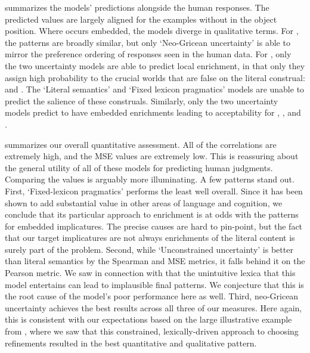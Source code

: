\documentclass[leqno,12pt]{article}
\begin{document}
 summarizes the models' predictions alongside
the human responses. The predicted values are largely aligned for the
examples without  in the object position. Where 
occurs embedded, the models diverge in qualitative terms. For
, the patterns are broadly similar, but only
`Neo-Gricean uncertainty' is able to mirror the preference ordering of
responses seen in the human data. For , only
the two uncertainty models are able to predict local enrichment, in
that only they assign high probability to the crucial worlds that are
false on the literal construal:  and . The
`Literal semantics' and `Fixed lexicon pragmatics' models are unable
to predict the salience of these construals. Similarly, only the two
uncertainty models predict  to have embedded
enrichments leading to acceptability for , , and
.


 summarizes our overall quantitative
assessment. All of the correlations are extremely high, and the MSE
values are extremely low. This is reassuring about the general utility
of all of these models for predicting human judgments. Comparing the
values is arguably more illuminating. A few patterns stand out.
First, `Fixed-lexicon pragmatics' performs the least well overall.
Since it has been shown to add substantial value in other areas of
language and cognition, we conclude that its particular approach to
enrichment is at odds with the patterns for embedded implicatures.
The precise causes are hard to pin-point, but the fact that our target
implicatures are not always enrichments of the literal content is
surely part of the problem.  Second, while `Unconstrained uncertainty'
is better than literal semantics by the Spearman and MSE metrics, it
falls behind it on the Pearson metric. We saw in connection with
 that the unintuitive lexica that this model
entertains can lead to implausible final patterns. We conjecture that
this is the root cause of the model's poor performance here as well.
Third, neo-Gricean uncertainty achieves the best results across all
three of our measures. Here again, this is consistent with our
expectations based on the large illustrative example from
, where we saw that this constrained,
lexically-driven approach to choosing refinements resulted in the best
quantitative and qualitative pattern.
\end{document}
